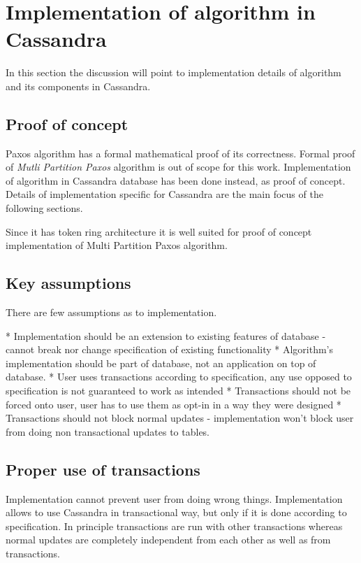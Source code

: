 
\section{Implementation of algorithm in Cassandra}\label{sec:algo:c}
In this section the discussion will point to implementation details of algorithm and its components in Cassandra. 


\subsection{Proof of concept}
Paxos algorithm has a formal mathematical proof of its correctness. Formal proof of \emph{Mutli Partition Paxos} algorithm is out of scope for this work. Implementation of algorithm in Cassandra database has been done instead, as proof of concept. Details of implementation specific for Cassandra are the main focus of the following sections.

Since it has token ring architecture it is well suited for proof of concept implementation of Multi Partition Paxos algorithm.



\subsection{Key assumptions}
There are few assumptions as to implementation.


* Implementation should be an extension to existing features of database - cannot break nor change specification of existing functionality
* Algorithm’s implementation should be part of database, not an application on top of database.
* User uses transactions according to specification, any use opposed to specification is not guaranteed to work as intended
* Transactions should not be forced onto user, user has to use them as opt-in in a way they were designed
* Transactions should not block normal updates - implementation won’t block user from doing non transactional updates to tables.

\subsection{Proper use of transactions}
Implementation cannot prevent user from doing wrong things. Implementation allows to use Cassandra in transactional way, but only if it is done according to specification. In principle transactions are run with other transactions whereas normal updates are completely independent from each other as well as from transactions. 



